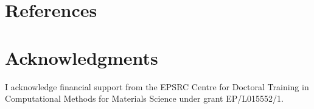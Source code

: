 \documentclass[twoside,english,final,5p,times,twocolumn]{elsarticle}
\begin{document}
\section{References}



\section{Acknowledgments}

I acknowledge financial support from the EPSRC Centre for Doctoral
Training in Computational Methods for Materials Science under grant
EP/L015552/1.
\end{document}
